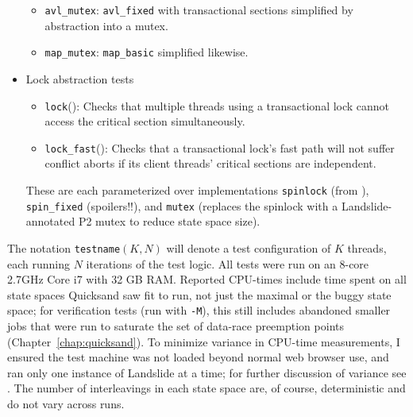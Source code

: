 \begin{itemize}
\begin{itemize}
		\item {\tt avl\_mutex}: {\tt avl\_fixed} with transactional sections simplified by abstraction into a mutex.
		\item {\tt map\_mutex}: {\tt map\_basic} simplified likewise.
	\end{itemize}
	\item Lock abstraction tests
	\begin{itemize}
		\item {\tt lock}(): Checks that multiple threads using a transactional lock
			cannot access the critical section simultaneously.
		\item {\tt lock\_fast}(): Checks that a transactional lock's fast path will not suffer conflict aborts
			if its client threads' critical sections are independent.
	\end{itemize}
		These are each parameterized over implementations {\tt spinlock} (from \cite{spinlock-rtm-github}),
		{\tt spin\_\allowbreak{}fixed} (spoilers!!),
		and {\tt mutex} (replaces the spinlock with a Landslide-annotated P2 mutex to reduce state space size).
\end{itemize}

The notation {\tt testname}$(K,N)$ will denote a test configuration of $K$ threads, each running $N$ iterations of the test logic.
All tests were run on an 8-core 2.7GHz Core i7 with 32 GB RAM.
Reported CPU-times include time spent on all state spaces
Quicksand saw fit to run,
not just the maximal or the buggy state space;
for verification tests (run with {\tt -M}),
this still includes abandoned smaller jobs that were run to saturate the set of data-race preemption points
(Chapter~\ref{chap:quicksand}).
To minimize variance in CPU-time measurements,
I ensured the test machine was not loaded beyond normal web browser use,
and ran only one instance of Landslide at a time;
for further discussion of variance see \cite{sigbovik-htm}.
The number of interleavings in each state space are, of course, deterministic and do not vary across runs.

